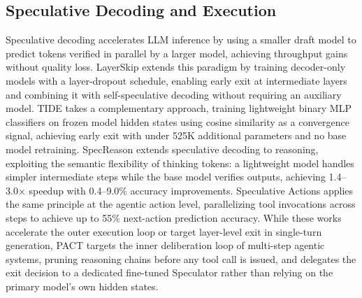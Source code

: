 \documentclass[letterpaper,twocolumn,10pt]{article}
\begin{document}
\subsection{Speculative Decoding and Execution}
Speculative decoding \cite{leviathan2023fast} accelerates LLM inference by using a 
smaller draft model to predict tokens verified in parallel by a larger model, achieving 
throughput gains without quality loss. LayerSkip \cite{elhoushi2024layerskip} extends 
this paradigm by training decoder-only models with a layer-dropout schedule, enabling 
early exit at intermediate layers and combining it with self-speculative decoding without 
requiring an auxiliary model. TIDE \cite{tide2025} takes a complementary approach, 
training lightweight binary MLP classifiers on frozen model hidden states using cosine 
similarity as a convergence signal, achieving early exit with under 525K additional 
parameters and no base model retraining. SpecReason \cite{pan2025specreason} extends 
speculative decoding to reasoning, exploiting the semantic flexibility of thinking tokens: 
a lightweight model handles simpler intermediate steps while the base model verifies 
outputs, achieving 1.4--3.0$\times$ speedup with 0.4--9.0\% accuracy improvements. 
Speculative Actions \cite{ye2026speculative} applies the same principle at the agentic 
action level, parallelizing tool invocations across steps to achieve up to 55\% 
next-action prediction accuracy. While these works accelerate the outer execution loop 
or target layer-level exit in single-turn generation, PACT targets the inner deliberation 
loop of multi-step agentic systems, pruning reasoning chains before any tool call is 
issued, and delegates the exit decision to a dedicated fine-tuned Speculator rather than 
relying on the primary model's own hidden states.
\end{document}
